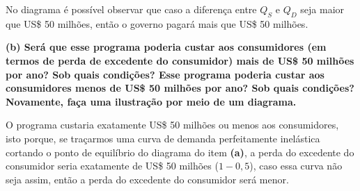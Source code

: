 \documentclass[12pt]{article}
\begin{document}
No diagrama é possível observar que caso a diferença entre $Q_S$ e $Q_D$ seja maior que US\$ 50 milhões, então o governo pagará mais que US\$ 50 milhões.

\textbf{(b) Será que esse programa poderia custar aos consumidores (em termos de perda de excedente do consumidor) mais de US\$ 50 milhões por ano? Sob quais condições? Esse programa poderia custar aos consumidores menos de US\$ 50 milhões por ano? Sob quais condições? Novamente, faça uma ilustração por meio de um diagrama.}

O programa custaria exatamente US\$ 50 milhões ou menos aos consumidores, isto porque, se traçarmos uma curva de demanda perfeitamente inelástica cortando o ponto de equilíbrio do diagrama do item \textbf{(a)}, a perda do excedente do consumidor seria exatamente de US\$ 50 milhões ($1-0,5$), caso essa curva não seja assim, então a perda do excedente do consumidor será menor.

\begin{center}
\end{center}
\end{document}
